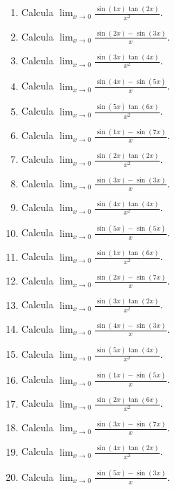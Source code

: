 \documentclass[11pt,a4paper]{article}
\begin{document}
\begin{enumerate}[label=\textbf{E\arabic*.},start=461]

\item Calcula $\displaystyle\lim_{x\to0}\frac{\sin(1x)\tan(2x)}{x^2}$.

\item Calcula $\displaystyle\lim_{x\to0}\frac{\sin(2x)-\sin(3x)}{x}$.

\item Calcula $\displaystyle\lim_{x\to0}\frac{\sin(3x)\tan(4x)}{x^2}$.

\item Calcula $\displaystyle\lim_{x\to0}\frac{\sin(4x)-\sin(5x)}{x}$.

\item Calcula $\displaystyle\lim_{x\to0}\frac{\sin(5x)\tan(6x)}{x^2}$.

\item Calcula $\displaystyle\lim_{x\to0}\frac{\sin(1x)-\sin(7x)}{x}$.

\item Calcula $\displaystyle\lim_{x\to0}\frac{\sin(2x)\tan(2x)}{x^2}$.

\item Calcula $\displaystyle\lim_{x\to0}\frac{\sin(3x)-\sin(3x)}{x}$.

\item Calcula $\displaystyle\lim_{x\to0}\frac{\sin(4x)\tan(4x)}{x^2}$.

\item Calcula $\displaystyle\lim_{x\to0}\frac{\sin(5x)-\sin(5x)}{x}$.

\item Calcula $\displaystyle\lim_{x\to0}\frac{\sin(1x)\tan(6x)}{x^2}$.

\item Calcula $\displaystyle\lim_{x\to0}\frac{\sin(2x)-\sin(7x)}{x}$.

\item Calcula $\displaystyle\lim_{x\to0}\frac{\sin(3x)\tan(2x)}{x^2}$.

\item Calcula $\displaystyle\lim_{x\to0}\frac{\sin(4x)-\sin(3x)}{x}$.

\item Calcula $\displaystyle\lim_{x\to0}\frac{\sin(5x)\tan(4x)}{x^2}$.

\item Calcula $\displaystyle\lim_{x\to0}\frac{\sin(1x)-\sin(5x)}{x}$.

\item Calcula $\displaystyle\lim_{x\to0}\frac{\sin(2x)\tan(6x)}{x^2}$.

\item Calcula $\displaystyle\lim_{x\to0}\frac{\sin(3x)-\sin(7x)}{x}$.

\item Calcula $\displaystyle\lim_{x\to0}\frac{\sin(4x)\tan(2x)}{x^2}$.

\item Calcula $\displaystyle\lim_{x\to0}\frac{\sin(5x)-\sin(3x)}{x}$.

\end{enumerate}
\end{document}
